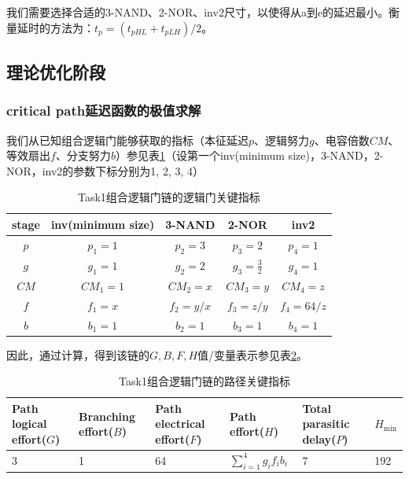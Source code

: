 \documentclass[UTF8,12pt,a4paper]{ctexart}
\begin{document}
我们需要选择合适的3-NAND、2-NOR、inv2尺寸，以使得从a到e的延迟最小。衡量延时的方法为：$t_p = (t_{pHL} + t_{pLH})/2$。

\subsection{理论优化阶段}

\subsubsection{critical path延迟函数的极值求解}

我们从已知组合逻辑门能够获取的指标（本征延迟$p$、逻辑努力$g$、电容倍数$CM$、等效扇出$f$、分支努力$b$）参见表\ref{tab:task1_metrics}（设第一个inv(minimum size)，3-NAND，2-NOR，inv2的参数下标分别为1, 2, 3, 4）

\begin{table}[htbp]
    \centering
    \caption{Task1组合逻辑门链的逻辑门关键指标}
    \label{tab:task1_metrics}
    \begin{tabular}{ccccc}
    \toprule
    stage & inv(minimum size) & 3-NAND & 2-NOR & inv2 \\
    \midrule
    $p$ & $p_1 = 1$ & $p_2 = 3$ & $p_3 = 2$ & $p_4 = 1$ \\
    $g$ & $g_1 = 1$ & $g_2 = 2$ & $g_3 = \frac{3}{2}$ & $g_4 = 1$ \\
    $CM$ & $CM_1 = 1$ & $CM_2 = x$ & $CM_3 = y$ & $CM_4 = z$ \\
    $f$ & $f_1 = x$ & $f_2 = y/x$ & $f_3 = z/y$ & $f_4 = 64/z$ \\
    $b$ & $b_1 = 1$ & $b_2 = 1$ & $b_3 = 1$ & $b_4 = 1$ \\
    \bottomrule
    \end{tabular}
\end{table}

因此，通过计算，得到该链的$G,B,F,H$值/变量表示参见表\ref{tab:task1_path_metrics}。

\begin{table}[htbp]
    \centering
    \caption{Task1组合逻辑门链的路径关键指标}
    \label{tab:task1_path_metrics}
    \begin{tabularx}{\linewidth}{XXXXXX}
    \toprule
    Path logical effort($G$) & Branching effort($B$) &
    Path electrical effort($F$) & Path effort($H$) &
    Total parasitic delay($P$) & $H_{\text{min}}$ \\
    \midrule
    3 & 1 & 64 & $\sum_{i=1}^4{g_i f_i b_i}$ & 7 & 192  \\
    \bottomrule
    \end{tabularx}
\end{table}
\end{document}

